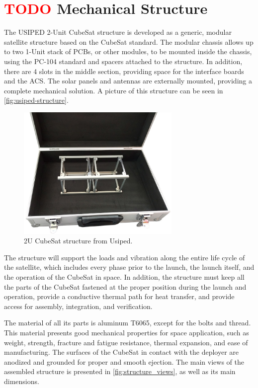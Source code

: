\section{ \textcolor{red}{TODO} Mechanical Structure}

The USIPED 2-Unit CubeSat structure is developed as a generic, modular satellite structure based on the CubeSat standard. The modular chassis allows up to two 1-Unit stack of PCBs, or other modules, to be mounted inside the chassis, using the PC-104 standard and spacers attached to the structure. In addition, there are 4 slots in the middle section, providing space for the interface boards and the ACS. The solar panels and antennas are externally mounted, providing a complete mechanical solution. A picture of this structure can be seen in \autoref{fig:usiped-structure}.

\begin{figure}[!ht]
    \begin{center}
        \includegraphics[width=0.7\textwidth]{figures/subsystems/usiped-2u-structure.jpg}
        \caption{2U CubeSat structure from Usiped.}
        \label{fig:usiped-structure}
    \end{center}
\end{figure}

The structure will support the loads and vibration along the entire life cycle of the satellite, which includes every phase prior to the launch, the launch itself, and the operation of the CubeSat in space. In addition, the structure must keep all the parts of the CubeSat fastened at the proper position during the launch and operation, provide a conductive thermal path for heat transfer, and provide access for assembly, integration, and verification.

The material of all its parts is aluminum T6065, except for the bolts and thread. This material presents good mechanical properties for space application, such as weight, strength, fracture and fatigue resistance, thermal expansion, and ease of manufacturing. The surfaces of the CubeSat in contact with the deployer are anodized and grounded for proper and smooth ejection. The main views of the assembled structure is presented in \autoref{fig:structure_views}, as well as its main dimensions.


